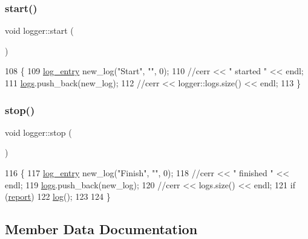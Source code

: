 \mbox{\label{classlogger_afba86118a3bb044060be8309b3fa755a}} 
\subsubsection{\texorpdfstring{start()}{start()}}
{\footnotesize\ttfamily void logger\+::start (\begin{DoxyParamCaption}{ }\end{DoxyParamCaption})\hspace{0.3cm}{\ttfamily [static]}}


\begin{DoxyCode}
108                   \{
109   \hyperlink{classlog__entry}{log\_entry} new\_log(\textcolor{stringliteral}{"Start"}, \textcolor{stringliteral}{""}, 0);
110   \textcolor{comment}{//cerr << " started " << endl;}
111   \hyperlink{classlogger_a46e89697a97bc41a90ec78763bfe4d39}{logs}.push\_back(new\_log);
112   \textcolor{comment}{//cerr << logger::logs.size() << endl;}
113 \}
\end{DoxyCode}
\mbox{\label{classlogger_abb856642f4e62c7a4a11cc4a2d963010}} 
\subsubsection{\texorpdfstring{stop()}{stop()}}
{\footnotesize\ttfamily void logger\+::stop (\begin{DoxyParamCaption}{ }\end{DoxyParamCaption})\hspace{0.3cm}{\ttfamily [static]}}


\begin{DoxyCode}
116                  \{
117   \hyperlink{classlog__entry}{log\_entry} new\_log(\textcolor{stringliteral}{"Finish"}, \textcolor{stringliteral}{""}, 0);
118   \textcolor{comment}{//cerr << " finished " << endl;}
119   \hyperlink{classlogger_a46e89697a97bc41a90ec78763bfe4d39}{logs}.push\_back(new\_log);
120   \textcolor{comment}{//cerr << logs.size() << endl;}
121   \textcolor{keywordflow}{if} (\hyperlink{classlogger_adbcc380b0ef53e23125f91e1c8f13f4e}{report})
122     \hyperlink{classlogger_ab518e6d927694bb7329e933fa75c27bf}{log}();
123 
124 \}
\end{DoxyCode}


\subsection{Member Data Documentation}
\mbox{\label{classlogger_a9d29b49bd318a719a8e85b59eac54fe0}} 

